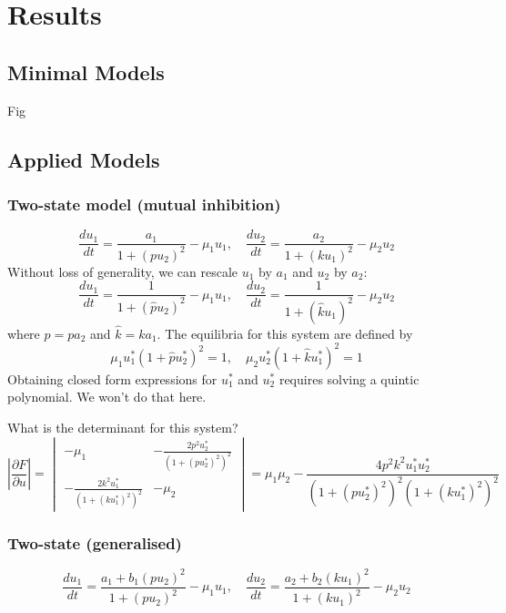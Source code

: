 \section{Results}

\subsection{Minimal Models}
Fig

\subsection{Applied Models}

\subsubsection{Two-state model (mutual inhibition)}

\begin{equation}
    \dfrac{du_1}{dt} = \dfrac{a_1} { 1 + (p u_2)^2 } - \mu_1 u_1, \quad
    \dfrac{du_2}{dt} = \dfrac{a_2} { 1 + (k u_1)^2 } - \mu_2 u_2
\end{equation}
Without loss of generality, we can rescale $u_1$ by $a_1$ and $u_2$ by $a_2$:
\begin{equation*}
    \dfrac{du_1}{dt} = \dfrac{1} { 1 + (\hat{p} u_2)^2 } - \mu_1 u_1, \quad
    \dfrac{du_2}{dt} = \dfrac{1} { 1 + (\hat{k} u_1)^2 } - \mu_2 u_2
\end{equation*}
where $\hat{p} = p a_2$ and $\hat{k} = k a_1$. The equilibria for this system are defined by
\begin{equation}
    \mu_1u_1^*(1+\hat{p}u_2^*)^2 = 1, \quad \mu_2u_2^*(1+\hat{k}u_1^*)^2 = 1
\end{equation}
Obtaining closed form expressions for $u_1^*$ and $u_2^*$ requires solving a quintic polynomial. We won't do that here.

What is the determinant for this system?
\begin{equation*}
    \left|\dfrac{\partial F}{\partial u}\right| = 
    \begin{vmatrix} -\mu_1 & -\frac{2 p^2 u_2^*}{(1 + (p u_2^*)^2)^2} \\
        -\frac{2k^2u_1^*}{(1+(k u_1^*)^2)^2} & -\mu_2
    \end{vmatrix}
    = \mu_1\mu_2 - \frac{4p^2k^2u_1^*u_2^*}{(1+(p u_2^*)^2)^2(1+(k u_1^*)^2)^2}
\end{equation*}

\subsubsection{Two-state (generalised)}
\begin{equation}
    \dfrac{du_1}{dt} = \dfrac{a_1 + b_1(p u_2)^2} { 1 + (p u_2)^2 } - \mu_1 u_1, \quad
    \dfrac{du_2}{dt} = \dfrac{a_2 + b_2(k u_1)^2} { 1 + (k u_1)^2 } - \mu_2 u_2
\end{equation}

